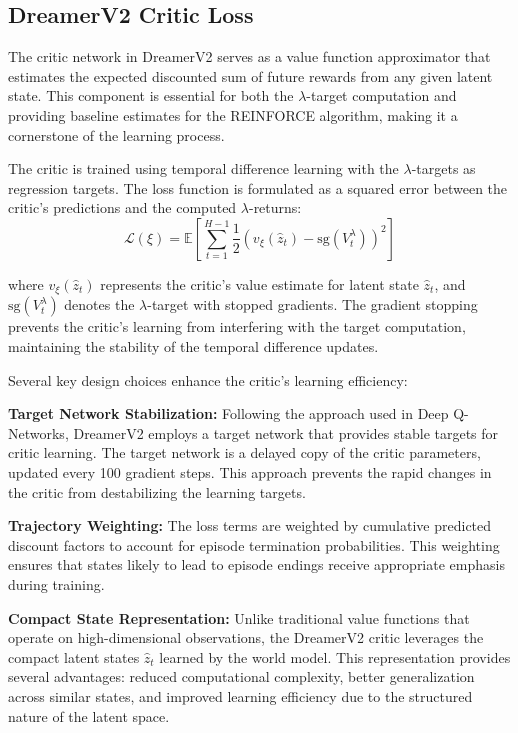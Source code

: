 \documentclass[
	english,
	ruledheaders=section,
	class=report,
	thesis={type=master},
	accentcolor=9c,
	custommargins=true,
	marginpar=false,
	parskip=half-,
	fontsize=11pt,
]{tudapub}
\begin{document}
\subsection{DreamerV2 Critic Loss}
\label{subsec:critic_loss}

The critic network in DreamerV2 serves as a value function approximator that estimates the expected discounted sum of future rewards from any given latent state. This component is essential for both the $\lambda$-target computation and providing baseline estimates for the REINFORCE algorithm, making it a cornerstone of the learning process.

The critic is trained using temporal difference learning with the $\lambda$-targets as regression targets. The loss function is formulated as a squared error between the critic's predictions and the computed $\lambda$-returns:
\begin{equation}
	\mathcal{L}(\xi) = \mathbb{E}\left[\sum_{t=1}^{H-1} \frac{1}{2} \left(v_\xi(\hat{z}_t) - \text{sg}(V^{\lambda}_t)\right)^2\right]
\end{equation}

where $v_\xi(\hat{z}_t)$ represents the critic's value estimate for latent state $\hat{z}_t$, and $\text{sg}(V^{\lambda}_t)$ denotes the $\lambda$-target with stopped gradients. The gradient stopping prevents the critic's learning from interfering with the target computation, maintaining the stability of the temporal difference updates.

Several key design choices enhance the critic's learning efficiency:

\textbf{Target Network Stabilization:} Following the approach used in Deep Q-Networks, DreamerV2 employs a target network that provides stable targets for critic learning. The target network is a delayed copy of the critic parameters, updated every 100 gradient steps. This approach prevents the rapid changes in the critic from destabilizing the learning targets.

\textbf{Trajectory Weighting:} The loss terms are weighted by cumulative predicted discount factors to account for episode termination probabilities. This weighting ensures that states likely to lead to episode endings receive appropriate emphasis during training.

\textbf{Compact State Representation:} Unlike traditional value functions that operate on high-dimensional observations, the DreamerV2 critic leverages the compact latent states $\hat{z}_t$ learned by the world model. This representation provides several advantages: reduced computational complexity, better generalization across similar states, and improved learning efficiency due to the structured nature of the latent space.
\end{document}
